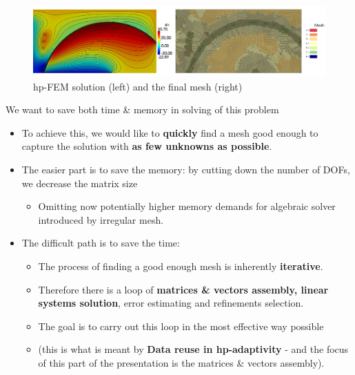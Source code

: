 \documentclass{beamer}
\begin{document}
\begin{frame}


\begin{center}
	\begin{figure}[h!]
			\centering
			\includegraphics[width=.8\textwidth]{final.png}
			\caption{hp-FEM solution (left) and the final mesh (right)}	
	\end{figure}
\end{center}

\vspace{-5mm} 
{\large We want to save both time \& memory in solving of this problem}

\vspace{-2mm} 
\begin{itemize}
\item To achieve this, we would like to \textbf{quickly} find a mesh good enough to capture the solution with \textbf{as few unknowns as possible}.
\item \vspace{-1mm} The easier part is to save the memory: by cutting down the number of DOFs, we decrease the matrix size
\begin{itemize}
\item \vspace{-2mm} Omitting now potentially higher memory demands for algebraic solver introduced by irregular mesh.
\end{itemize}
\item \vspace{-1mm} The difficult path is to save the time:
\begin{itemize}
\item \vspace{-2mm} The process of finding a good enough mesh is inherently \textbf{iterative}.
\item \vspace{-2mm} Therefore there is a loop of \textbf{matrices \& vectors assembly, linear systems solution}, error estimating and refinements selection.
\item \vspace{-2mm} The goal is to carry out this loop in the most effective way possible
\item \vspace{-2mm} (this is what is meant by \textbf{Data reuse in hp-adaptivity} - and the focus of this part of the presentation is the matrices \& vectors assembly).
\end{itemize}
\end{itemize}

\end{frame}
\end{document}
